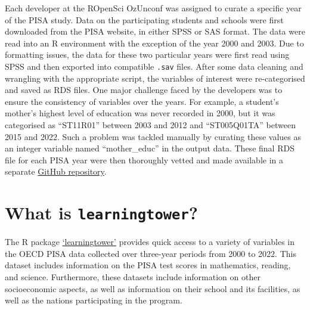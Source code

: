 Each developer at the ROpenSci OzUnconf was assigned to curate a specific year of the PISA study. Data on the participating students and schools were first downloaded from the PISA website, in either SPSS or SAS format. The data were read into an R environment with the exception of the year 2000 and 2003. Due to formatting issues, the data for these two particular years were first read using SPSS and then exported into compatible \texttt{.sav} files. After some data cleaning and wrangling with the appropriate script, the variables of interest were re-categorised and saved as RDS files. One major challenge faced by the developers was to ensure the consistency of variables over the years. For example, a student's mother's highest level of education was never recorded in 2000, but it was categorised as ``ST11R01'' between 2003 and 2012 and ``ST005Q01TA'' between 2015 and 2022. Such a problem was tackled manually by curating these values as an integer variable named ``mother\_educ'' in the output data. These final RDS file for each PISA year were then thoroughly vetted and made available in a separate \href{https://github.com/kevinwang09/learningtower_masonry}{GitHub repository}.

\section{\texorpdfstring{What is \texttt{learningtower}?}{What is learningtower?}}\label{what-is-learningtower}

The R package \href{https://cran.r-project.org/web/packages/learningtower/index.html}{`learningtower'} \citep{learningtower} provides quick access to a variety of variables in the OECD PISA data collected over three-year periods from 2000 to 2022. This dataset includes information on the PISA test scores in mathematics, reading, and science. Furthermore, these datasets include information on other socioeconomic aspects, as well as information on their school and its facilities, as well as the nations participating in the program.

